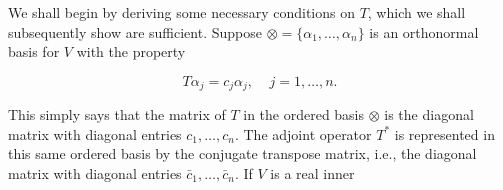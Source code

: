We shall begin by deriving some necessary conditions on \(T\), which we shall subsequently show are sufficient. Suppose \(\otimes=\{\alpha_{1},\ldots,\alpha_{n}\}\) is an orthonormal basis for \(V\) with the property

\[T\alpha_{j}=c_{j}\alpha_{j},\ \ \ \ \ j=1,\ldots,n.\]

This simply says that the matrix of \(T\) in the ordered basis \(\otimes\) is the diagonal matrix with diagonal entries \(c_{1},\ldots,c_{n}\). The adjoint operator \(T^{*}\) is represented in this same ordered basis by the conjugate transpose matrix, i.e., the diagonal matrix with diagonal entries \(\bar{c}_{1},\ldots,\bar{c}_{n}\). If \(V\) is a real inner